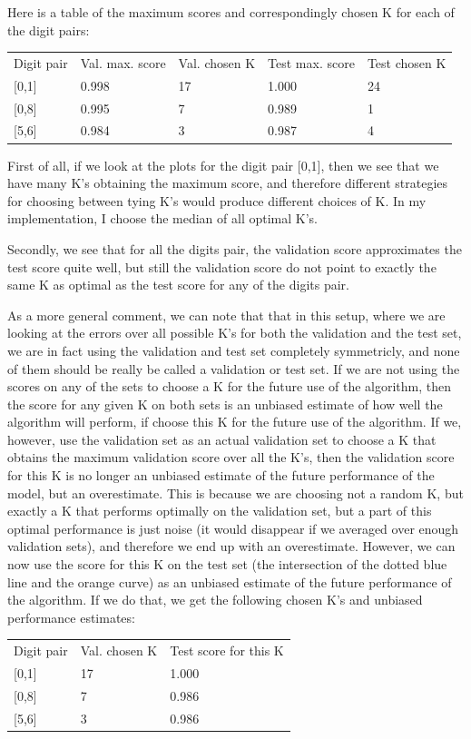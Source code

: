 Here is a table of the maximum scores and correspondingly chosen K for each of the digit pairs:

\begin{tabular}{lllll}
Digit pair & Val. max. score & Val. chosen K & Test max. score & Test chosen K \\
{[}0,1{]}  & 0.998                 & 17                  & 1.000           & 24            \\
{[}0,8{]}  & 0.995                 & 7                   & 0.989           & 1             \\
{[}5,6{]}  & 0.984                 & 3                   & 0.987           & 4            
\end{tabular}


First of all, if we look at the plots for the digit pair [0,1], then we see that we have many K's obtaining the maximum score, and therefore different strategies for choosing between tying K's would produce different choices of K. In my implementation, I choose the median of all optimal K's. 

Secondly, we see that for all the digits pair, the validation score approximates the test score quite well, but still the validation score do not point to exactly the same K as optimal as the test score for any of the digits pair. 

As a more general comment, we can note that that in this setup, where we are looking at the errors over all possible K's for both the validation and the test set, we are in fact using the validation and test set completely symmetricly, and none of them should be really be called a validation or test set. If we are not using the scores on any of the sets to choose a K for the future use of the algorithm, then the score for any given K on both sets is an unbiased estimate of how well the algorithm will perform, if choose this K for the future use of the algorithm. If we, however, use the validation set as an actual validation set to choose a K that obtains the maximum validation score over all the K's, then the validation score for this K is no longer an unbiased estimate of the future performance of the model, but an overestimate. This is because we are choosing not a random K, but exactly a K that performs optimally on the validation set, but a part of this optimal performance is just noise (it would disappear if we averaged over enough validation sets), and therefore we end up with an overestimate. However, we can now use the score for this K on the test set (the intersection of the dotted blue line and the orange curve) as an unbiased estimate of the future performance of the algorithm. If we do that, we get the following chosen K's and unbiased performance estimates:

\begin{tabular}{lll}
Digit pair & Val. chosen K & Test score for this K \\
{[}0,1{]}  & 17                  & 1.000                 \\
{[}0,8{]}  & 7                   & 0.986                 \\
{[}5,6{]}  & 3                   & 0.986                
\end{tabular}